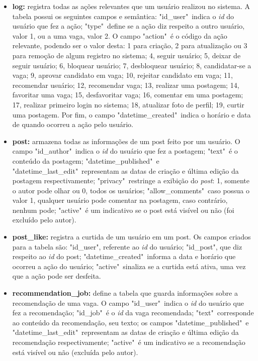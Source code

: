 \begin{itemize}
    \item \textbf{log:} registra todas as ações relevantes que um usuário realizou no sistema. A tabela possui os seguintes campos e semântica: "id\_user"\ indica o \textit{id} do usuário que fez a ação; "type"\ define se a ação diz respeito a outro usuário, valor 1, ou a uma vaga, valor 2. O campo "action"\ é o código da ação relevante, podendo ser o valor desta: 1 para criação, 2 para atualização ou 3 para remoção de algum registro no sistema; 4, seguir usuário; 5, deixar de seguir usuário; 6, bloquear usuário; 7, desbloquear usuário; 8, candidatar-se a vaga; 9, aprovar candidato em vaga; 10, rejeitar candidato em vaga; 11, recomendar usuário; 12, recomendar vaga; 13, realizar uma postagem; 14, favoritar uma vaga; 15, desfavoritar vaga; 16, comentar em uma postagem; 17, realizar primeiro login no sistema; 18, atualizar foto de perfil; 19, curtir uma postagem. Por fim, o campo "datetime\_created"\ indica o horário e data de quando ocorreu a ação pelo usuário.
    
    \item \textbf{post:} armazena todas as informações de um post feito por um usuário. O campo "id\_author"\ indica o \textit{id} do usuário que fez a postagem; "text"\ é o conteúdo da postagem; "datetime\_published"\ e "datetime\_last\_edit"\ representam as datas de criação e última edição da postagem respectivamente; "privacy"\ restringe a exibição do \textit{post}: 1, somente o autor pode olhar ou 0, todos os usuários; "allow\_comments"\ caso possua o valor 1, qualquer usuário pode comentar na postagem, caso contrário, nenhum pode; "active"\ é um indicativo se o post está visível ou não (foi excluído pelo autor).
    
    \item \textbf{post\_like:} registra a curtida de um usuário em um post. Os campos criados para a tabela são: "id\_user", referente ao \textit{id} do usuário; "id\_post", que diz respeito ao \textit{id} do post; "datetime\_created"\ informa a data e horário que ocorreu a ação do usuário; "active"\ sinaliza se a curtida está ativa, uma vez que a ação pode ser desfeita.
    
    \item \textbf{recommendation\_job:} define a tabela que guarda informações sobre a recomendação de uma vaga. O campo "id\_user"\ indica o \textit{id} do usuário que fez a recomendação; "id\_job"\ é o \textit{id} da vaga recomendada; "text"\ corresponde ao conteúdo da recomendação, seu texto; os campos "datetime\_published"\ e "datetime\_last\_edit"\ representam as datas de criação e última edição da recomendação respectivamente; "active"\ é um indicativo se a recomendação está visível ou não (excluída pelo autor).
    

\end{itemize}
